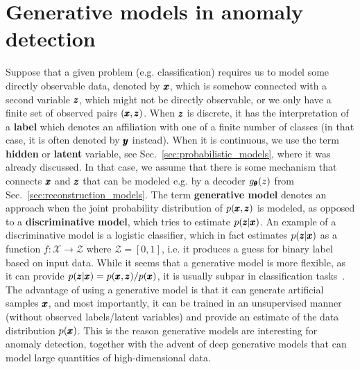 \chapter{Generative models in anomaly detection} \label{sec:chapter_survey}
Suppose that a given problem (e.g. classification) requires us to model some directly observable data, denoted by $\pmb{{x}}$, which is somehow connected with a second variable $\pmb{{z}}$, which might not be directly observable, or we only have a finite set of observed pairs $(\pmb{{x}},\pmb{{z}})$. When $\pmb{{z}}$ is discrete, it has the interpretation of a \textbf{label} which denotes an affiliation with one of a finite number of classes (in that case, it is often denoted by $\pmb{{y}}$ instead). When it is continuous, we use the term \textbf{hidden} or \textbf{latent} variable, see Sec.~\ref{sec:probabilistic_models}, where it was already discussed. In that case, we assume that there is some mechanism that connects $\pmb{{x}}$ and $\pmb{{z}}$ that can be modeled e.g. by a decoder $g_{\pmb{{\theta}}}(z)$ from Sec.~\ref{sec:reconstruction_models}. The term \textbf{generative model} denotes an approach when the joint probability distribution of $p(\pmb{{x}},\pmb{{z}})$ is modeled, as opposed to a \textbf{discriminative model}, which tries to estimate $p(\pmb{{z}} \vert \pmb{{x}})$. An example of a discriminative model is a logistic classifier, which in fact estimates $p(\pmb{{z}} \vert \pmb{{x}})$ as a function $f:\mathcal{X} \rightarrow \mathcal{Z}$ where $\mathcal{Z} = [0,1]$, i.e. it produces a guess for binary label based on input data. While it seems that a generative model is more flexible, as it can provide  $p(\pmb{{z}} \vert \pmb{{x}}) = p(\pmb{{x}},\pmb{{z}})/p(\pmb{{x}})$, it is usually subpar in classification tasks~\cite{ng2001discriminative,bishop2007generative}. The advantage of using a generative model is that it can generate artificial samples $\pmb{{x}}$, and most importantly, it can be trained in an unsupervised manner (without observed labels/latent variables) and provide an estimate of the data distribution $p(\pmb{{x}})$. This is the reason generative models are interesting for anomaly detection, together with the advent of deep generative models that can model large quantities of high-dimensional data.

